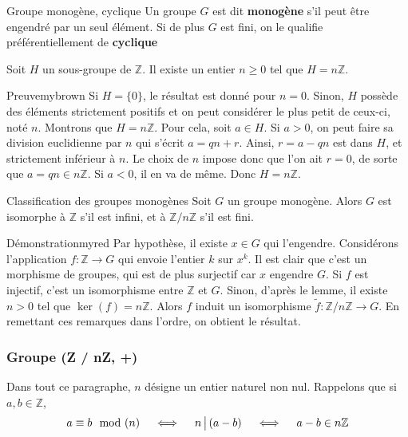     \begin{defi}{Groupe monogène, cyclique}{}
        Un groupe $G$ est dit \textbf{monogène} s’il peut être engendré par un seul élément. Si de plus $G$ est fini, on le qualifie préférentiellement de \textbf{cyclique}
    \end{defi}

    \begin{lem}{}{}
        Soit $H$ un sous-groupe de $\mathbb{Z}$. Il existe un entier $n \geq 0$ tel que $H = n \mathbb{Z}$.
    \end{lem}

    \begin{demo}{Preuve}{mybrown}
        Si $H = \{ 0 \}$, le résultat est donné pour $n = 0$. Sinon, $H$ possède des éléments strictement positifs et on peut considérer le plus petit de ceux-ci, noté $n$. Montrons que $H = n \mathbb{Z}$. Pour cela, soit $a \in H$. Si $a > 0$, on peut faire sa division euclidienne par $n$ qui s’écrit $a = qn + r$. Ainsi, $ r = a - qn$ est dans $H$, et strictement inférieur à $n$. Le choix de $n$ impose donc que l’on ait $r = 0$, de sorte que $a = qn \in n \mathbb{Z}$. Si $a < 0$, il en va de même. Donc $H = n \mathbb{Z}$.
    \end{demo}

    \begin{theo}{Classification des groupes monogènes}{}
        Soit $G$ un groupe monogène. Alors $G$ est isomorphe à $\mathbb{Z}$ s’il est infini, et à $\mathbb{Z} / n \mathbb{Z}$ s’il est fini.
    \end{theo}

    \begin{demo}{Démonstration}{myred}
        Par hypothèse, il existe $x \in G$ qui l’engendre. Considérons l’application $f : \mathbb{Z} \to G$ qui envoie l’entier $k$ sur $x^{k}$. Il est clair que c’est un morphisme de groupes, qui est de plus surjectif car $x$ engendre $G$. Si $f$ est injectif, c’est un isomorphisme entre $\mathbb{Z}$ et $G$. Sinon, d’après le lemme, il existe $n > 0$ tel que $\ker(f) = n \mathbb{Z}$. Alors $f$ induit un isomorphisme $\tilde{f} :\mathbb{Z} / n \mathbb{Z} \to G$. En remettant ces remarques dans l’ordre, on obtient le résultat.
    \end{demo}

    \subsubsection{Groupe (Z / nZ, +)}

    Dans tout ce paragraphe, $n$ désigne un entier naturel non nul. Rappelons que si $a,b \in \mathbb{Z}$, 
    \[ a \equiv b \mod(n) \quad \iff \quad n \, \big| \, (a-b) \quad \iff \quad a-b \in n \mathbb{Z} \]

